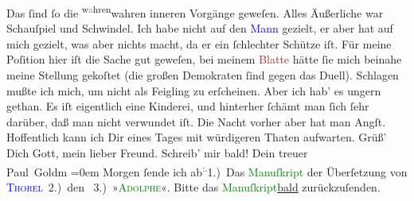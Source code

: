            \pstart
           Das ſind ſo die \substVorne{}\textsuperscript{w\textcolor{gray}{a}hren}{\allowbreak}\substDazwischen{}wahren\substHinten{} inneren Vorgänge geweſen. Alles Äußerliche war Schauſpiel und Schwindel. Ich
               habe nicht auf den \textcolor{blue}{Mann}{}
               gezielt, er aber hat auf mich gezielt, was aber nichts macht, da  er ein ſchlechter Schütze iſt. Für meine Poſition hier iſt die Sache gut
               geweſen, bei meinem \textcolor{brown}{Blatte}{}
               hätte ſie mich beinahe meine Stellung gekoſtet (die großen Demokraten ſind gegen das
               Duell). Schlagen mußte ich mich, um nicht als {\pb}Feigling zu erſcheinen. Aber ich hab’ es ungern gethan. Es iſt eigentlich eine
               Kinderei, und hinterher ſchämt man ſich ſehr darüber, daß man nicht verwundet iſt.
               Die Nacht vorher aber hat man Angſt.\pend
           \pstart
           Hoffentlich kann ich Dir eines Tages mit würdigeren Thaten aufwarten.\pend
           \pstart
           Grüß’ Dich Gott, mein lieber Freund. Schreib’ mir bald!\pend
           \pstart
           Dein treuer {\\[\baselineskip]}\spacefill\mbox{Paul Goldm}\pend
           \leftskip=0em{}\pstart
           \noindent{}Morgen ſende ich ab\substVorne{}\textsuperscript{:.}\substDazwischen{}1.)\substHinten{} Das \textcolor{green}{Manuſkript}{}
                  der Überſetzung von \textsc{\textcolor{blue}{Thorel}{}\ledrightnote{\textcolor{blue}{Jean Thorel}}} 2.) den \label{K_L02791-41v}\label{K_L02791-41h} 3.) »\textsc{\textcolor{green}{Adolphe}{}\ledrightnote{\textcolor{green}{Adolphe. Anecdote trouvée dans les papiers d’un inconnu}}}«. Bitte das \textcolor{green}{Manuſkript}{}\uline{bald} zurückzuſenden.\pend
           \endnumbering{}  
      
